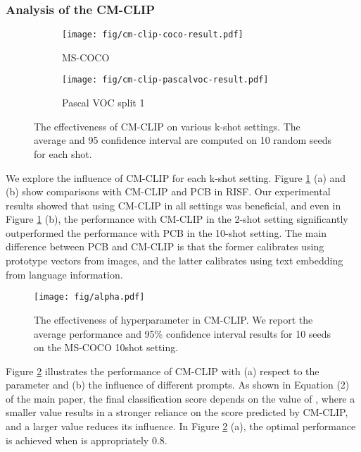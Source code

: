 \documentclass{article}
\begin{document}
\subsubsection{Analysis of the CM-CLIP}

\begin{figure}[h]
    \centering
    \begin{subfigure}[]{0.48\textwidth}
    \texttt{[image: fig/cm-clip-coco-result.pdf]}
    \caption{MS-COCO}
    \end{subfigure}
    \begin{subfigure}[]{0.48\textwidth}
    \texttt{[image: fig/cm-clip-pascalvoc-result.pdf]}
    \caption{Pascal VOC split 1}
    \end{subfigure}
    \caption{The effectiveness of CM-CLIP on various k-shot settings.
    The average and 95 confidence interval are computed on 10 random seeds for each shot.}
    \label{fig:cm-clip-result}
\end{figure}

We explore the influence of CM-CLIP for each k-shot setting. 
Figure \ref{fig:cm-clip-result} (a) and (b) show comparisons with CM-CLIP and PCB in RISF. 
Our experimental results showed that using CM-CLIP in all settings was beneficial, and even in Figure \ref{fig:cm-clip-result} (b), the performance with CM-CLIP in the 2-shot setting significantly outperformed the performance with PCB in the 10-shot setting. 
The main difference between PCB and CM-CLIP is that the former calibrates using prototype vectors from images, and the latter calibrates using text embedding from language information.

\begin{figure}[h]
    \centering
\texttt{[image: fig/alpha.pdf]}
\caption{The effectiveness of hyperparameter  in CM-CLIP. We report the average performance and 95\% confidence interval results for 10 seeds on the MS-COCO 10shot setting.}
\label{fig:cmclip}
\end{figure}

Figure \ref{fig:cmclip} illustrates the performance of CM-CLIP with (a) respect to the parameter  and (b) the influence of different prompts.
As shown in Equation (2) of the main paper, the final classification score  depends on the value of , where a smaller value results in a stronger reliance on the score predicted by CM-CLIP, and a larger value reduces its influence.
In Figure \ref{fig:cmclip} (a), the optimal performance is achieved when  is appropriately 0.8.
\end{document}
